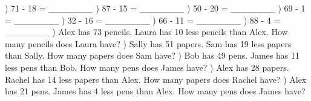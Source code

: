 \documentclass{article}%
\begin{document}
\newline%
) 71 {-} 18 = \_\_\_\_\_\_\_%
\newline%
\newline%
) 87 {-} 15 = \_\_\_\_\_\_\_%
\newline%
\newline%
) 50 {-} 20 = \_\_\_\_\_\_\_%
\newline%
\newline%
) 69 {-} 1 = \_\_\_\_\_\_\_%
\newline%
\newline%
) 32 {-} 16 = \_\_\_\_\_\_\_%
\newline%
\newline%
) 66 {-} 11 = \_\_\_\_\_\_\_%
\newline%
\newline%
) 88 {-} 4 = \_\_\_\_\_\_\_%
\newline%
\newline%
) Alex has 73 pencils. Laura has 10 less pencils than Alex. How many pencils does Laura have?%
\newline%
\newline%
) Sally has 51 papers. Sam has 19 less papers than Sally. How many papers does Sam have?%
\newline%
\newline%
) Bob has 49 pens. James has 11 less pens than Bob. How many pens does James have?%
\newline%
\newline%
) Alex has 28 papers. Rachel has 14 less papers than Alex. How many papers does Rachel have?%
\newline%
\newline%
) Alex has 21 pens. James has 4 less pens than Alex. How many pens does James have?%
\newline%
\newline%
\newline%
\pagebreak%
\large%
\end{document}
